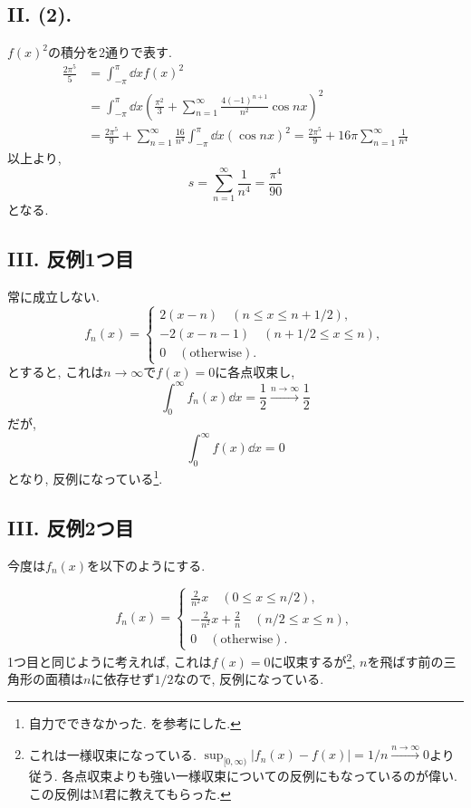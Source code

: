 \subsection*{II. (2). }
$f(x)^2$の積分を2通りで表す. 
\begin{align*}
  \frac{2\pi^5}{5}
  &=\int_{-\pi}^{\pi}\dd{x}f(x)^2\\
  &=\int_{-\pi}^{\pi}\dd{x}\left( \frac{\pi^2}{3}+ \sum_{n=1}^{\infty}\frac{4(-1)^{n+1}}{n^2}\cos{nx}\right)^2\\
  &=\frac{2\pi^5}{9}+\sum_{n=1}^{\infty}\frac{16}{n^4}\int_{-\pi}^{\pi}\dd{x}(\cos{nx})^2=\frac{2\pi^5}{9}+16\pi\sum_{n=1}^{\infty}\frac{1}{n^4}
\end{align*}
以上より, 
\begin{equation}
  s=\sum_{n=1}^{\infty}\frac{1}{n^4}=\frac{\pi^4}{90}
\end{equation}
となる. 

\subsection*{III. 反例1つ目}
常に成立しない. 
\begin{equation}
  f_n(x)=\begin{cases}
    2(x-n)\quad (n\leq x\leq n+1/2), \\
    -2(x-n-1)\quad (n+1/2\leq x\leq n), \\
    0\quad (\text{otherwise}). 
  \end{cases}
\end{equation}
とすると, これは$n\to\infty$で$f(x)=0$に各点収束し, 
\begin{equation}
  \int_{0}^{\infty}f_n(x)\dd{x}=\frac{1}{2}\xrightarrow{n\to\infty}\frac{1}{2}
\end{equation}
だが, 
\begin{equation}
  \int_{0}^{\infty}f(x)\dd{x}=0
\end{equation}
となり, 反例になっている\footnote{自力でできなかった. \cite{kyokugensekibun}を参考にした. }.

\subsection*{III. 反例2つ目}
今度は$f_n(x)$を以下のようにする. 

\begin{equation}
  f_n(x)=\begin{cases}
    \frac{2}{n^2}x\quad (0\leq x\leq n/2), \\
    -\frac{2}{n^2}x+\frac{2}{n}\quad (n/2\leq x\leq n), \\
    0\quad (\text{otherwise}). 
  \end{cases}
\end{equation}
1つ目と同じように考えれば, これは$f(x)=0$に収束するが\footnote{これは一様収束になっている. $\sup_{[0, \infty)}|f_n(x)-f(x)|=1/n\xrightarrow{n\to\infty} 0$より従う. 各点収束よりも強い一様収束についての反例にもなっているのが偉い. この反例はM君に教えてもらった. }, $n$を飛ばす前の三角形の面積は$n$に依存せず$1/2$なので, 反例になっている. 


